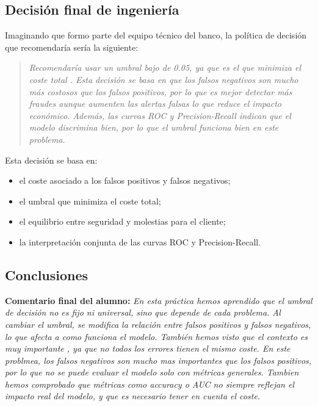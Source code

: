 \documentclass[12pt,oneside]{book}
\begin{document}
\subsection{Decisión final de ingeniería}

Imaginando que formo parte del equipo técnico del banco, la política de decisión que recomendaría sería la siguiente:

\begin{quote}
\textit{Recomendaría usar un umbral bajo de 0.05, ya que es el que minimiza el coste total .
Esta decisión se basa en que los falsos negativos 
son mucho más costosos que los falsos positivos, 
por lo que es mejor detectar más fraudes aunque 
aumenten las alertas falsas lo que reduce el impacto económico.
Además, las curvas ROC y Precision-Recall indican que el modelo discrimina bien, por lo que el umbral funciona
bien en este problema.}
\end{quote}

\noindent Esta decisión se basa en:
\begin{itemize}
    \item el coste asociado a los falsos positivos y falsos negativos;
    \item el umbral que minimiza el coste total;
    \item el equilibrio entre seguridad y molestias para el cliente;
    \item la interpretación conjunta de las curvas ROC y Precision-Recall.
\end{itemize}

\subsection{Conclusiones}

\textbf{Comentario final del alumno:}  
\textit{En esta práctica hemos aprendido que el umbral de decisión no es fijo ni universal,
 sino que depende de cada problema. Al cambiar el umbral, 
se modifica la relación entre falsos positivos y 
falsos negativos, lo que afecta a como funciona el modelo.
También hemos visto que el contexto es muy importante
, ya que no todos los errores tienen el mismo coste. 
En este problmea, los falsos negativos son mucho mas importantes que los 
falsos positivos, por lo que no se puede evaluar el modelo solo con métricas generales.
Tambien hemos comprobado que métricas como accuracy o AUC 
no siempre reflejan el impacto real del modelo, 
y que es necesario tener en cuenta el coste.}
\end{document}
